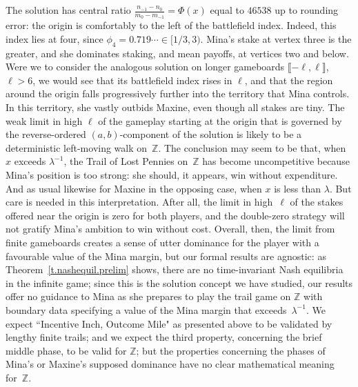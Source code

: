 \documentclass[letterpaper,11pt,oneside,reqno]{amsbook}
\newcommand{\R}{\ensuremath{\mathbb{R}}}
\newcommand{\Z}{\ensuremath{\mathbb{Z}}}
\numberwithin{figure}{chapter}
\theoremstyle{definition}
\theoremstyle{definition}
\theoremstyle{definition}
\theoremstyle{definition}
\theoremstyle{definition}
\newcommand{\minamm}{\mathcal{M}}
\newcommand{\PhiMac}{\Phi}
\begin{document}
The solution has central ratio $\tfrac{n_{-1} - n_0}{m_0 - m_{-1}} = \PhiMac(x)$ equal to $46538$ up to rounding error: the origin is comfortably to the left of the battlefield index. Indeed, this index lies at four, since $\phi_4 = 0.719 \cdots \in [1/3,3)$.  Mina's stake at vertex three is the greater, and she dominates staking, and mean payoffs, at vertices two and below. Were we to consider the analogous solution on longer gameboards $\llbracket -\ell,\ell \rrbracket$, $\ell > 6$, we would see that its battlefield index rises  in $\ell$, and that the region around the origin falls progressively further into the territory that Mina controls.
 In this territory, she vastly outbids Maxine, even though all stakes are tiny. The weak limit in high $\ell$ of the gameplay starting at the origin that is governed by the reverse-ordered $(a,b)$-component of the solution is likely to be a deterministic left-moving walk on~$\Z$. The conclusion may seem to be that, when $x$ exceeds $\lambda^{-1}$, the Trail of Lost Pennies on~$\Z$ has become uncompetitive because Mina's position is too strong: she should, it appears, win without expenditure. And as usual likewise for Maxine in the opposing case, when $x$ is less than $\lambda$. But care is needed in this interpretation. After all, the limit in high~$\ell$ of the stakes offered near the origin is zero for both players, and the double-zero strategy will not gratify Mina's ambition to win without cost. Overall, then, the limit from finite gameboards creates a sense of utter dominance for the player with a favourable value of the Mina margin, but our formal results are agnostic: as 
Theorem~\ref{t.nashequil.prelim} shows, there are no time-invariant Nash equilibria in the infinite game; since this is the solution concept we have studied, our results offer no guidance to Mina as she prepares to play the trail game on $\Z$
 with boundary data specifying a value of the Mina margin that exceeds~$\lambda^{-1}$. We expect ``Incentive Inch, Outcome Mile" as presented above to be validated by lengthy finite trails; and we expect the third property, concerning the brief middle phase, to be valid for $\Z$; but the properties concerning the phases of Mina's or Maxine's supposed dominance have no clear mathematical meaning for~$\Z$.  



\end{document}
